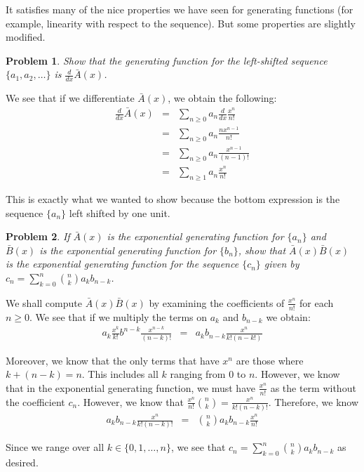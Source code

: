 \documentclass[psamsfonts]{amsart}
\newtheorem{prob}{Problem}[section]
\newenvironment{sol}{{\bfseries Solution}}{\qedsymbol}
\theoremstyle{definition}
\theoremstyle{remark}
\numberwithin{equation}{section}
\begin{document}
It satisfies many of the nice properties we have seen for generating functions (for example, linearity with respect to the sequence). But some properties are slightly modified. 

\begin{prob}
Show that the generating function for the left-shifted sequence $\{a_1, a_2, \ldots\}$ is $\frac{d}{dx} \bar{A}(x)$. 
\end{prob}

\begin{sol}
We see that if we differentiate $\bar{A}(x)$, we obtain the following:
\begin{eqnarray}
\frac{d}{dx} \bar{A}(x) &=& \sum_{n \geq 0} a_n \frac{d}{dx} \frac{x^n}{n!} \\
&=& \sum_{n \geq 0} a_n \frac{n x^{n-1}}{n!} \\
&=& \sum_{n \geq 0} a_n \frac{x^{n-1}}{(n-1)!} \\
&=& \sum_{n \geq 1} a_n \frac{x^{n}}{n!} 
\end{eqnarray}

This is exactly what we wanted to show because the bottom expression is the sequence $\{a_n \}$ left shifted by one unit.
\end{sol}

\begin{prob}
If $\bar{A}(x)$ is the exponential generating function for $\{ a_n \}$ and $\bar{B}(x)$ is the exponential generating function for $\{b_n\}$, show that $\bar{A}(x) \bar{B}(x)$ is the exponential generating function for the sequence $\{c_n \}$ given by $c_n = \sum_{k=0}^n {n \choose k} a_k b_{n-k}$. 
\end{prob}

\begin{sol}
We shall compute $\bar{A}(x) \bar{B}(x)$ by examining the coefficients of $\frac{x^n}{n!}$ for each $n \geq 0$. We see that if we multiply the terms on $a_k$ and $b_{n-k}$ we obtain:
\begin{eqnarray}
a_k \frac{x^k}{k!} b^{n-k} \frac{x^{n-k}}{(n-k)!} &=& a_k b_{n-k} \frac{x^n}{k! (n-k!)}
\end{eqnarray}

Moreover, we know that the only terms that have $x^n$ are those where $k + (n-k) = n$. This includes all $k$ ranging from $0$ to $n$. However, we know that in the exponential generating function, we must have $\frac{x^n}{n!}$ as the term without the coefficient $c_n$. However, we know that $\frac{x^n}{n!} {n \choose k} = \frac{x^n}{k! (n - k)!}$. Therefore, we know 
\begin{eqnarray}
a_k b_{n-k} \frac{x^n}{k!(n-k)!} &=& {n \choose k} a_k b_{n-k}  \frac{x^n}{n!}
\end{eqnarray} 

Since we range over all $k \in \{0, 1, \ldots, n\}$, we see that $c_n = \sum_{k=0}^n {n \choose k} a_k b_{n-k}$ as desired.
\end{sol}
\end{document}
